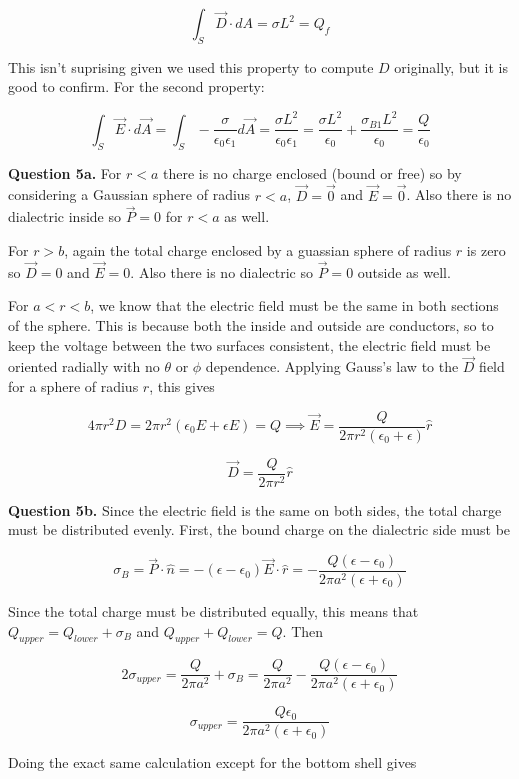 \documentclass[letterpaper, reqno,11pt]{article}
\newcommand{\ep}{\epsilon}
\begin{document}
\[
    \int_S\vec D\cdot dA=\sigma L^2=Q_f
\]

This isn't suprising given we used this property to compute $D$ originally, but it is good to confirm. For the second property: 

$$
    \int_S \vec E\cdot d\vec A=\int_S-\frac{\sigma}{\epsilon_0\epsilon_1}d\vec A=\frac{\sigma L^2}{\epsilon_0\epsilon_1}=\frac{\sigma L^2}{\epsilon_0}+\frac{\sigma_{B1} L^2}{\epsilon_0}=\frac{Q}{\epsilon_0}
$$

{\noindent\bf Question 5a.} For $r<a$ there is no charge enclosed (bound or free) so by considering a Gaussian sphere of radius $r<a$, $\vec D=\vec 0$ and $\vec E=\vec 0$. Also there is no dialectric inside so $\vec P=0$ for $r<a$ as well.

For $r>b$, again the total charge enclosed by a guassian sphere of radius $r$ is zero so $\vec D=0$ and $\vec E=0$. Also there is no dialectric so $\vec P=0$ outside as well.

For $a<r<b$, we know that the electric field must be the same in both sections of the sphere. This is because both the inside and outside are conductors, so to keep the voltage between the two surfaces consistent, the electric field must be oriented radially with no $\theta$ or $\phi$ dependence. Applying Gauss's law to the $\vec D$ field for a sphere of radius $r$, this gives 

\[
    4\pi r^2 D=2\pi r^2(\ep_0 E + \ep E)=Q\implies \vec E=\frac{Q}{2\pi r^2 (\epsilon_0+\epsilon)}\hat r
\]

\[
    \vec D=\frac{Q}{2\pi r^2}\hat r
\]

{\noindent\bf Question 5b.} Since the electric field is the same on both sides, the total charge must be distributed evenly. First, the bound charge on the dialectric side must be 

\[
    \sigma_B=\vec P\cdot\hat n=-(\epsilon-\epsilon_0)\vec E\cdot\hat r=-\frac{Q(\epsilon-\epsilon_0)}{2\pi a^2(\epsilon+\ep_0)}
\]

Since the total charge must be distributed equally, this means that $Q_{upper}=Q_{lower}+\sigma_B$ and $Q_{upper}+Q_{lower}=Q$. Then 

\[
    2\sigma_{upper}=\frac Q{2\pi a^2}+\sigma_B=\frac Q{2\pi a^2}-\frac{Q(\epsilon-\epsilon_0)}{2\pi a^2(\epsilon+\ep_0)}
\]

\[
    \sigma_{upper}=\frac{Q\epsilon_0}{2\pi a^2(\epsilon+\ep_0)}
\]

Doing the exact same calculation except for the bottom shell gives 
\end{document}
